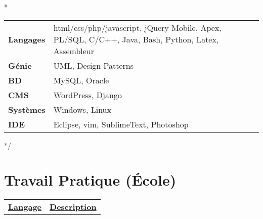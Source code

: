 \documentclass[a4paper,10pt]{extarticle}
\begin{document}
\/*
\begin{tabular}{ll}
\textbf{Langages} & 
html/css/php/javascript, jQuery Mobile, Apex, PL/SQL, C/C++, Java, Bash, Python,    Latex, Assembleur  \\
\textbf{Génie} &
UML, Design Patterns\\
\textbf{BD} & MySQL, Oracle \\
\textbf{CMS} & WordPress, Django \\
\textbf{Systèmes} & Windows, Linux \\
\textbf{IDE} & Eclipse, vim, SublimeText, Photoshop
\end{tabular}
*/
\begin{comment}
\begin{tabular*}{\linewidth}{
				   p{\dimexpr 0.15\linewidth-1\tabcolsep }  
                   p{\dimexpr 0.25\linewidth-1\tabcolsep } 
                   p{\dimexpr 0.25\linewidth-1\tabcolsep }  
                   p{\dimexpr 0.25\linewidth-1\tabcolsep } 
                   } 
   		         & Programmation & Web/Framework & BD \vspace{1.5em}\tabularnewline
À l'aise		 &               &   Django,WordPress            & \tabularnewline[10ex]
Très à l'aise 	 &               &   Ruby on rails           & \tabularnewline[10ex]
Mon best         & Java \newline C\#  & & \tabularnewline[10ex]
\end{tabular*}
\end{comment}
\clearpage














\section{Travail Pratique \small (École)}
\begin{tabular*}{\textwidth}{p{ }
						 	 p{ }} 
\centering\textbf{\underline{Langage}} &\centering\textbf{\underline{Description}}
\end{tabular*}
\\\\
\end{document}
